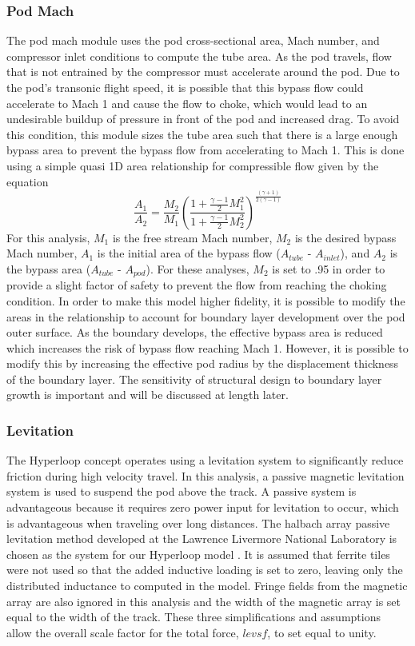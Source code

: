 \subsubsection{Pod Mach}
	The pod mach module uses the pod cross-sectional area, Mach number, and
	compressor inlet conditions to compute the tube area. As the pod travels,
	flow that is not entrained by the compressor must accelerate around the pod.
	Due to the pod’s transonic flight speed, it is possible that this bypass
	flow could accelerate to Mach 1 and cause the flow to choke, which would
	lead to an undesirable buildup of pressure in front of the pod and
	increased drag. To avoid this condition, this module sizes the tube area
	such that there is a large enough bypass area to prevent the bypass flow
	from accelerating to Mach 1. This is done using a simple quasi 1D area
	relationship for compressible flow given by the equation
	\begin{equation}
		\label{eq:mach_to_area}
		\frac{A_{1}}{A_{2}}=\frac{M_{2}}{M_{1}} \left( \frac{1+\frac{\gamma -1}{2}M_{1}^{2}}{1+\frac{\gamma -1}{2}M_{2}^{2}} \right)^{\frac{( \gamma +1 )}{2 ( \gamma -1  )}}
	\end{equation}
	For this analysis, $M_1$ is the free stream Mach number, $M_2$ is the
	desired bypass Mach number, $A_1$ is the initial area of the bypass flow
	($A_{tube}$ - $A_{inlet}$), and $A_2$ is the bypass area ($A_{tube}$ - $A_{pod}$).
	For these analyses, $M_2$ is set to .95 in order to provide a slight factor
	of safety to prevent the flow from reaching the choking condition.
	In order to make this model higher fidelity, it is possible to modify the
	areas in the relationship to account for boundary layer development over
	the pod outer surface. As the boundary develops, the effective bypass area
	is reduced which increases the risk of bypass flow reaching Mach 1. However,
	it is possible to modify this by increasing the effective pod radius by the
	displacement thickness of the boundary layer. The sensitivity of structural
	design to boundary layer growth is important and will be discussed at length later.
\subsubsection{Levitation}

	The Hyperloop concept operates using a levitation system to significantly
	reduce friction during high velocity travel. In this analysis, a
	passive magnetic levitation system is used to suspend the pod above the
	track. A passive system is advantageous because it requires
	zero power input for levitation to occur, which is advantageous when
	traveling over long distances. The halbach array passive levitation method
	developed at the Lawrence Livermore National Laboratory is chosen as the
	system for our Hyperloop model \cite{inductrack}. It is assumed that
	ferrite tiles were not used so that the added inductive loading is set to
	zero, leaving only the distributed inductance to computed in the model.
	Fringe fields from the magnetic array are also ignored in this analysis and
	the width of the magnetic array is set equal to the width of the track.
	These three simplifications and assumptions allow the overall scale factor
	for the total force, $levsf$, to set equal to unity.

